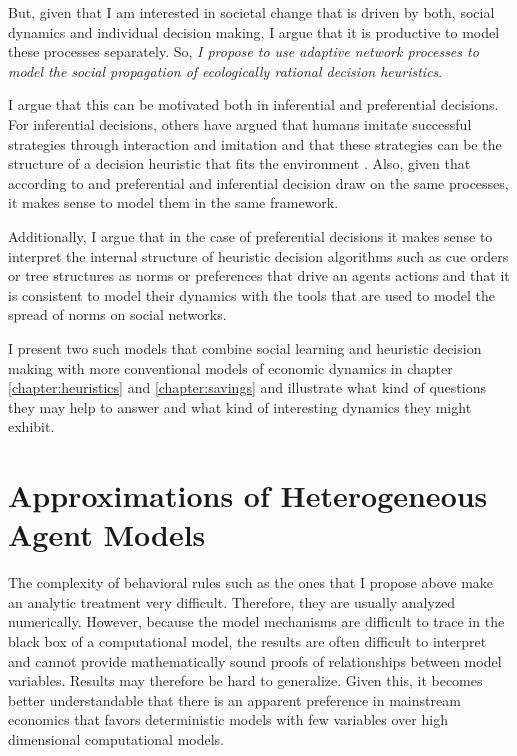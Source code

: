 But, given that I am interested in societal change that is driven by both, social dynamics and individual decision making, I argue that it is productive to model these processes separately. So, \emph{I propose to use adaptive network processes to model the social propagation of ecologically rational decision heuristics}.

I argue that this can be motivated both in inferential and preferential decisions. For inferential decisions, others have argued that humans imitate successful strategies through interaction and imitation \citep{Bandura1971, Traulsen2010} and that these strategies can be the structure of a decision heuristic that fits the environment \citep{Garcia-Retamero2009}. Also, given that according to \cite{Weber2009} and \cite{Gigerenzer2011} preferential and inferential decision draw on the same processes, it makes sense to model them in the same framework. 

Additionally, I argue that in the case of preferential decisions it makes sense to interpret the internal structure of heuristic decision algorithms such as cue orders or tree structures as norms or preferences that drive an agents actions and that it is consistent to model their dynamics with the tools that are used to model the spread of norms on social networks.

I present two such models that combine social learning and heuristic decision making with more conventional models of economic dynamics in chapter \ref{chapter:heuristics} and \ref{chapter:savings} and illustrate what kind of questions they may help to answer and what kind of interesting dynamics they might exhibit.

\section{Approximations of Heterogeneous Agent Models}

The complexity of behavioral rules such as the ones that I propose above make an analytic treatment very difficult. Therefore, they are usually analyzed numerically. However, because the model mechanisms are difficult to trace in the black box of a computational model, the results are often difficult to interpret and cannot provide mathematically sound proofs of relationships between model variables. Results may therefore be hard to generalize. Given this, it becomes better understandable that there is an apparent preference in mainstream economics that favors deterministic models with few variables over high dimensional computational models.

